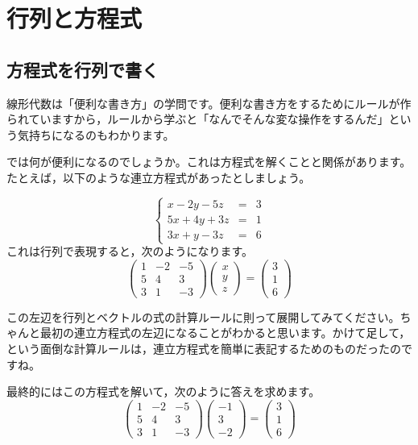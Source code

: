 \documentclass{ltjsbook}
\begin{document}
\chapter{行列と方程式}
\label{L03_Equation}

\section{方程式を行列で書く}
線形代数は「便利な書き方」の学問です。便利な書き方をするためにルールが作られていますから，ルールから学ぶと「なんでそんな変な操作をするんだ」という気持ちになるのもわかります。

では何が便利になるのでしょうか。これは方程式を解くことと関係があります。
たとえば，以下のような連立方程式があったとしましょう。

\[
	\left \{
	\begin{array}{lcl}
		x-2y-5z  & = & 3 \\
		5x+4y+3z & = & 1 \\
		3x+y-3z  & = & 6
	\end{array}
	\right .
\]
これは行列で表現すると，次のようになります。
\[
	\begin{pmatrix} 1 & -2 & -5 \\
                5 & 4  & 3  \\
                3 & 1  & -3\end{pmatrix}
	\begin{pmatrix} x \\ y \\ z \end{pmatrix}
	=
	\begin{pmatrix} 3 \\ 1 \\ 6 \end{pmatrix}
\]

この左辺を行列とベクトルの式の計算ルールに則って展開してみてください。ちゃんと最初の連立方程式の左辺になることがわかると思います。かけて足して，という面倒な計算ルールは，連立方程式を簡単に表記するためのものだったのですね。

最終的にはこの方程式を解いて，次のように答えを求めます。
\[
	\begin{pmatrix} 1 & -2 & -5 \\
                5 & 4  & 3  \\
                3 & 1  & -3\end{pmatrix}
	\begin{pmatrix} -1 \\ 3 \\ -2 \end{pmatrix}
	=
	\begin{pmatrix} 3 \\ 1 \\ 6 \end{pmatrix}
\]
\end{document}
